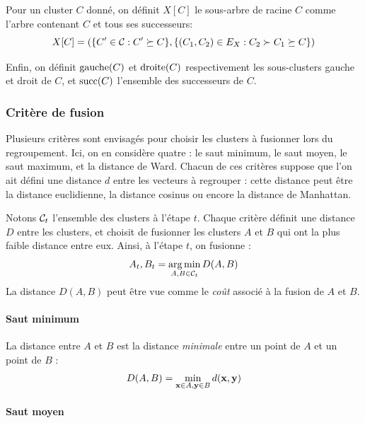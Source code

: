 Pour un cluster $C$ donné, on définit $X[C]$ le sous-arbre de racine $C$ comme l'arbre contenant $C$ et tous ses successeurs:
\begin{equation}
    X[C] = (\{C' \in \Clusters : C' \succeq C\}, \{(C_1, C_2) \in E_X : C_2 \succ C_1 \succeq C\})
\end{equation}

Enfin, on définit $\gauche(C)$ et $\droite(C)$ respectivement les sous-clusters gauche et droit de $C$, et $\succs(C)$ l'ensemble des successeurs de $C$.

\subsubsection{Critère de fusion}
\label{sec:te-clustering-linkage}

Plusieurs critères sont envisagés pour choisir les clusters à fusionner lors du regroupement. Ici, on en considère quatre : le saut minimum, le saut moyen, le saut maximum, et la distance de Ward. Chacun de ces critères suppose que l'on ait défini une distance $d$ entre les vecteurs à regrouper : cette distance peut être la distance euclidienne, la distance cosinus ou encore la distance de Manhattan. 

Notons $\cal{C}_t$ l'ensemble des clusters à l'étape $t$. Chaque critère définit une distance $D$ entre les clusters, et choisit de fusionner les clusters $A$ et $B$ qui ont la plus faible distance entre eux. Ainsi, à l'étape $t$, on fusionne :
\begin{equation}
    A_t, B_t = \argmin_{A, B \in \cal{C}_t} D(A, B)
\end{equation}
La distance $D(A, B)$ peut être vue comme le \textit{coût} associé à la fusion de $A$ et $B$. 

\paragraph{Saut minimum}

La distance entre $A$ et $B$ est la distance \textit{minimale} entre un point de $A$ et un point de $B$ :
\begin{equation}
    D(A, B) = \min_{\bf{x} \in A, \bf{y} \in B} d(\bf{x}, \bf{y})
\end{equation}

\paragraph{Saut moyen}

